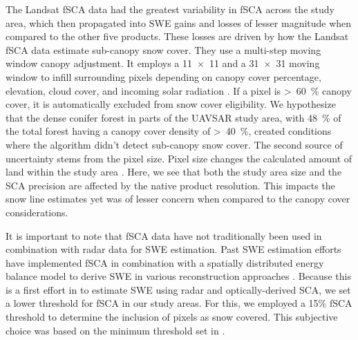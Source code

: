 The Landsat fSCA data had the greatest variability in fSCA across the study area, which then propagated into SWE gains and losses of lesser magnitude when compared to the other five products. These losses are driven by how the Landsat fSCA data estimate sub-canopy snow cover. They use a multi-step moving window canopy adjustment. It employs a 11~$\times$~11 and a 31~$\times$~31 moving window to infill surrounding pixels depending on canopy cover percentage, elevation, cloud cover, and incoming solar radiation \citep{selkowitzUSGSLandsatSnow2017}. If a pixel is >~60~\% canopy cover, it is automatically excluded from snow cover eligibility. We hypothesize that the dense conifer forest in parts of the UAVSAR study area, with 48~\% of the total forest having a canopy cover density of >~40~\%, created conditions where the algorithm didn't detect sub-canopy snow cover. The second source of uncertainty stems from the pixel size. Pixel size changes the calculated amount of land within the study area \citep{bairHowTradeoffsSatellite2023}. Here, we see that both the study area size and the SCA precision are affected by the native product resolution. This impacts the snow line estimates yet was of lesser concern when compared to the canopy cover considerations.

It is important to note that fSCA data have not traditionally been used in combination with radar data for SWE estimation. Past SWE estimation efforts have implemented fSCA in combination with a spatially distributed energy balance model to derive SWE in various reconstruction approaches \citep{clineEstimatingSpatialDistribution1998,molotchEstimatingDistributionSnow2008,rittgerSpatialEstimatesSnow2016,margulisLandsatEraSierraNevada2016}. Because this is a first effort in to estimate SWE using radar and optically-derived SCA, we set a lower threshold for fSCA in our study areas. For this, we employed a 15\% fSCA threshold to determine the inclusion of pixels as snow covered. This subjective choice was based on the minimum threshold set in \cite{painterRetrievalSubpixelSnow2009}. 

